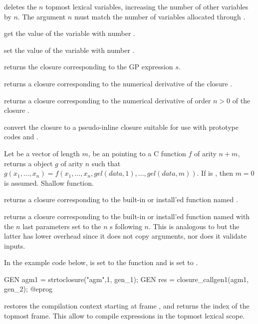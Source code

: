 deletes the $n$ topmost lexical variables,
increasing the number of other variables by $n$. The argument $n$ must match
the number of variables allocated through .

 get the value of the variable with number .

 set the value of the variable with number
.


 returns the closure corresponding to the
GP expression $s$.

 returns a closure corresponding to the
numerical derivative of the closure .

 returns a closure corresponding to
the numerical derivative of order $n > 0$ of the closure .

 convert the closure  to
a pseudo-inline closure suitable for use with prototype codes  and
.

Let  be a vector of length $m$,  be an 
pointing to a C function $f$ of arity $n+m$, returns a  object
$g$ of arity $n$ such that
$g(x_1,\ldots,x_n)=f(x_1,\ldots,x_n,gel(data,1),...,gel(data,m))$. If
 is , then $m=0$ is assumed. Shallow function.

 returns a closure corresponding to the
built-in or install'ed function named .

 returns a closure
corresponding to the built-in or install'ed function named  with the
$n$ last parameters set to the $n$ s following $n$. This is
analogous to  but the latter has
lower overhead since it does not copy arguments, nor does it validate inputs.

In the example code below,  is set to the function
 and  is set to .

\bprog
  GEN agm1 = strtoclosure("agm",1, gen_1);
  GEN res = closure_callgen1(agm1, gen_2);
@eprog

 restores the compilation context starting
at frame , and returns the index of the topmost frame. This allow to
compile expressions in the topmost lexical scope.

